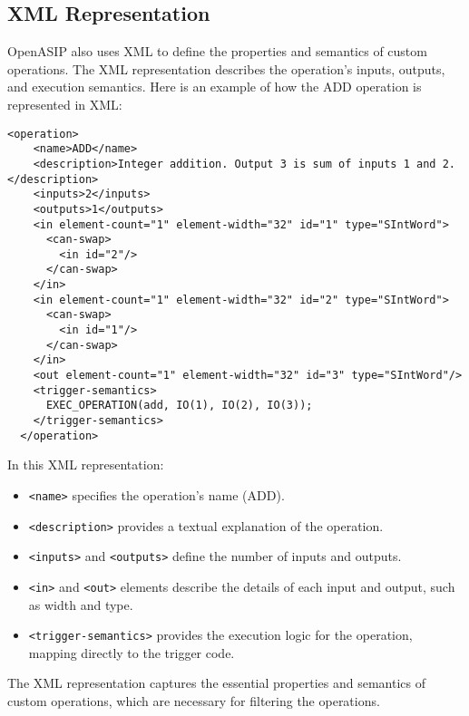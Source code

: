 \subsection{XML Representation}

OpenASIP also uses XML to define the properties and semantics of custom operations.
The XML representation describes the operation's inputs, outputs, and execution semantics.
Here is an example of how the ADD operation is represented in XML:

\begin{lstlisting}[caption={The XML representation of ADD}]
  <operation>
    <name>ADD</name>
    <description>Integer addition. Output 3 is sum of inputs 1 and 2.</description>
    <inputs>2</inputs>
    <outputs>1</outputs>
    <in element-count="1" element-width="32" id="1" type="SIntWord">
      <can-swap>
        <in id="2"/>
      </can-swap>
    </in>
    <in element-count="1" element-width="32" id="2" type="SIntWord">
      <can-swap>
        <in id="1"/>
      </can-swap>
    </in>
    <out element-count="1" element-width="32" id="3" type="SIntWord"/>
    <trigger-semantics>
      EXEC_OPERATION(add, IO(1), IO(2), IO(3));
    </trigger-semantics>
  </operation>
\end{lstlisting}

In this XML representation:
\begin{itemize}
  \item \texttt{<name>} specifies the operation's name (ADD).
  \item \texttt{<description>} provides a textual explanation of the operation.
  \item \texttt{<inputs>} and \texttt{<outputs>} define the number of inputs and outputs.
  \item \texttt{<in>} and \texttt{<out>} elements describe the details of each input and output, such as width and type.
  \item \texttt{<trigger-semantics>} provides the execution logic for the operation, mapping directly to the trigger code.
\end{itemize}

The XML representation captures the essential properties and semantics of custom operations,
which are necessary for filtering the operations.
